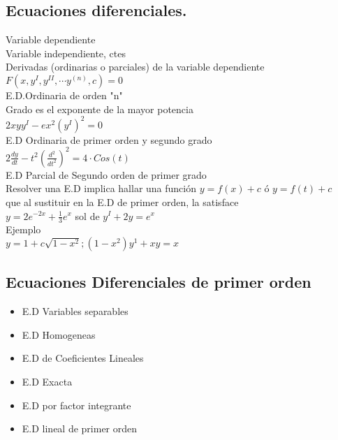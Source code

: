 \documentclass[12pt]{article}
\begin{document}
  \subsection{Ecuaciones diferenciales.}
  Variable dependiente
  \\ Variable independiente, ctes
  \\ Derivadas (ordinarias o parciales) de la variable dependiente
  \\$F(x,y^I,y^{II}, \cdots y^{(n)},c)=0$
  \\E.D.Ordinaria de orden "n"
  \\Grado es el exponente de la mayor potencia
  \\$2xyy^I-ex^2(y^I)^2=0$
  \\E.D Ordinaria de primer orden y segundo grado
  \\$2\frac{dy}{dt}-t^2 \left(
 \frac{d^2}{dt^2}   
  \right)^2=4\cdot Cos(t)$
  \\E.D Parcial de Segundo orden de primer grado
  \\Resolver una E.D implica hallar una función $y=f(x)+c$ ó $y=f(t)+c$
  \\que al sustituir en la E.D de primer orden, la satisface
  \\$y=2e^{-2x}+\frac{1}{3}e^x$
  sol de $y^I+2y=e^x$
  \\Ejemplo
 \\ $y=1+c\sqrt{1-x^2}; (1-x^2)y^1+xy=x$

  \subsection{Ecuaciones Diferenciales de primer orden}
  \begin{itemize}
    \item E.D Variables separables
    \item E.D Homogeneas
    \item E.D de Coeficientes Lineales
    \item E.D Exacta
    \item E.D por factor integrante
    \item E.D lineal de primer orden
  \end{itemize}
\end{document}
